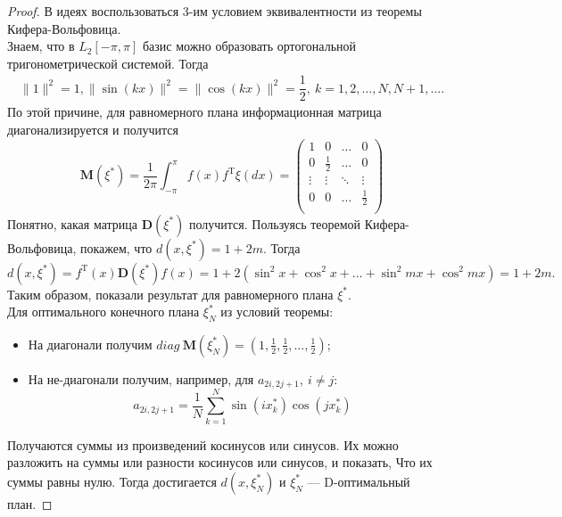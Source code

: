 \documentclass[12pt, a4paper]{article}
\begin{document}
	\begin{proof}
		В идеях воспользоваться 3-им условием эквивалентности из теоремы Кифера-Вольфовица.\\
		Знаем, что в $L_2[-\pi, \pi]$ базис можно образовать ортогональной тригонометрической системой. Тогда 
		\begin{align*}
			\|1\|^2=1, \|\sin(kx)\|^2=\|\cos(kx)\|^2=\dfrac{1}{2},~k=1,2,\dots,N,N+1,\dots.
		\end{align*}
		По этой причине, для равномерного плана информационная матрица диагонализируется и получится
		\begin{equation*}
			\mathbf{M}(\xi^*)=\dfrac{1}{2\pi}\int_{-\pi}^\pi f(x)f^\mathrm{T}\xi(dx)=
			\begin{pmatrix}
				1&0&\dots&0\\
				0&\frac{1}{2}&\dots&0\\
				\vdots&\vdots&\ddots&\vdots\\
				0&0&\dots&\frac{1}{2}\\
			\end{pmatrix}
		\end{equation*}
		Понятно, какая матрица $\mathbf{D}(\xi^*)$ получится. Пользуясь теоремой Кифера-Вольфовица, покажем, что $d(x, \xi^*)=1+2m$. Тогда
		\begin{equation*}
			d(x, \xi^*) = f^\mathrm{T}(x)\mathbf{D}(\xi^*)f(x)=1+2(\sin^2x+\cos^2x+\dots+\sin^2mx+\cos^2mx)=1+2m.
		\end{equation*}
		Таким образом, показали результат для равномерного плана $\xi^*$.\\
		Для оптимального конечного плана $\xi^*_N$ из условий теоремы:
		\begin{itemize}
			\item На диагонали получим $\textit{diag}~\mathbf{M}(\xi_N^*)=(1,\frac{1}{2},\frac{1}{2},\dots, \frac{1}{2})$;
			\item На не-диагонали получим, например, для $a_{2i,2j+1},~i\not=j$:
			\begin{equation*}
				a_{2i,2j+1}=\dfrac{1}{N}\sum_{k=1}^N\sin(ix_k^*)\cos(jx_k^*)
			\end{equation*}
		\end{itemize}
		Получаются суммы из произведений косинусов или синусов. Их можно разложить на суммы или разности косинусов или синусов, и показать, Что их суммы равны нулю. Тогда достигается $d(x,\xi_N^*)$ и $\xi_N^*$ --- D-оптимальный план.
	\end{proof}
\end{document}
